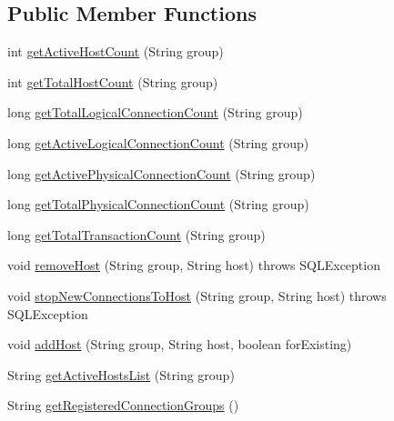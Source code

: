 \subsection*{Public Member Functions}
\begin{DoxyCompactItemize}
\item 
int \mbox{\hyperlink{interfacecom_1_1mysql_1_1cj_1_1jdbc_1_1jmx_1_1_load_balance_connection_group_manager_m_bean_a3bde5be188b6c43133f6766b24ca0e0d}{get\+Active\+Host\+Count}} (String group)
\item 
int \mbox{\hyperlink{interfacecom_1_1mysql_1_1cj_1_1jdbc_1_1jmx_1_1_load_balance_connection_group_manager_m_bean_a7477f551144b318f458cae8012da280b}{get\+Total\+Host\+Count}} (String group)
\item 
long \mbox{\hyperlink{interfacecom_1_1mysql_1_1cj_1_1jdbc_1_1jmx_1_1_load_balance_connection_group_manager_m_bean_a990479f3b514da36f62cce2e9639e3ef}{get\+Total\+Logical\+Connection\+Count}} (String group)
\item 
long \mbox{\hyperlink{interfacecom_1_1mysql_1_1cj_1_1jdbc_1_1jmx_1_1_load_balance_connection_group_manager_m_bean_af5f3cc4063e3aa237e9774d5d2c161ab}{get\+Active\+Logical\+Connection\+Count}} (String group)
\item 
long \mbox{\hyperlink{interfacecom_1_1mysql_1_1cj_1_1jdbc_1_1jmx_1_1_load_balance_connection_group_manager_m_bean_a2ac28098b1dc44aab2a62b6a6730d9d7}{get\+Active\+Physical\+Connection\+Count}} (String group)
\item 
long \mbox{\hyperlink{interfacecom_1_1mysql_1_1cj_1_1jdbc_1_1jmx_1_1_load_balance_connection_group_manager_m_bean_a12f21183a708bf2ef19b0272df94836b}{get\+Total\+Physical\+Connection\+Count}} (String group)
\item 
long \mbox{\hyperlink{interfacecom_1_1mysql_1_1cj_1_1jdbc_1_1jmx_1_1_load_balance_connection_group_manager_m_bean_a568d8a28564e0e4f6ddc61e598ec757e}{get\+Total\+Transaction\+Count}} (String group)
\item 
void \mbox{\hyperlink{interfacecom_1_1mysql_1_1cj_1_1jdbc_1_1jmx_1_1_load_balance_connection_group_manager_m_bean_a62791f1b8cf09bff2624d9706d385d1a}{remove\+Host}} (String group, String host)  throws S\+Q\+L\+Exception
\item 
void \mbox{\hyperlink{interfacecom_1_1mysql_1_1cj_1_1jdbc_1_1jmx_1_1_load_balance_connection_group_manager_m_bean_a8f15db86412fbd3a8e43da0e1bc78fd6}{stop\+New\+Connections\+To\+Host}} (String group, String host)  throws S\+Q\+L\+Exception
\item 
void \mbox{\hyperlink{interfacecom_1_1mysql_1_1cj_1_1jdbc_1_1jmx_1_1_load_balance_connection_group_manager_m_bean_ac75da8bca9d66ddf61f38d40637e6277}{add\+Host}} (String group, String host, boolean for\+Existing)
\item 
String \mbox{\hyperlink{interfacecom_1_1mysql_1_1cj_1_1jdbc_1_1jmx_1_1_load_balance_connection_group_manager_m_bean_acab93052475e7203a5d66783ea41a5e4}{get\+Active\+Hosts\+List}} (String group)
\item 
String \mbox{\hyperlink{interfacecom_1_1mysql_1_1cj_1_1jdbc_1_1jmx_1_1_load_balance_connection_group_manager_m_bean_a9eff7e6cc2a298da10fd288d695ae89e}{get\+Registered\+Connection\+Groups}} ()
\end{DoxyCompactItemize}


